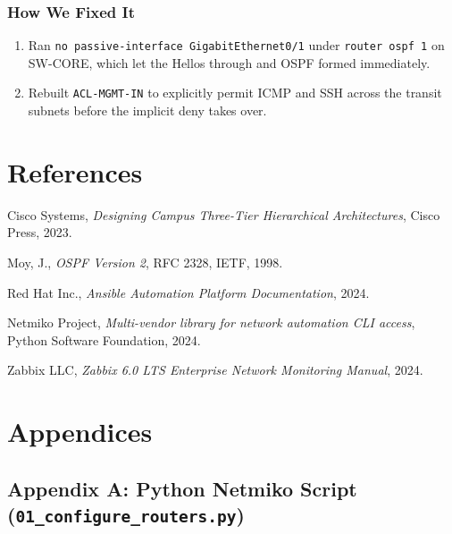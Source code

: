 \documentclass[11pt,a4paper]{article}
\newcommand{\hr}{\vspace{0.2cm}\noindent\hrulefill\vspace{0.2cm}}
\begin{document}
\subsubsection{How We Fixed It}
\begin{enumerate}
    \item Ran \texttt{no passive-interface GigabitEthernet0/1} under \texttt{router ospf 1} on SW-CORE, which let the Hellos through and OSPF formed immediately.
    \item Rebuilt \texttt{ACL-MGMT-IN} to explicitly permit ICMP and SSH across the transit subnets before the implicit deny takes over.
\end{enumerate}

\hr

\section{References}

\begin{enumerate}[label={[\arabic*]}]
    \item Cisco Systems, \textit{Designing Campus Three-Tier Hierarchical Architectures}, Cisco Press, 2023.
    \item Moy, J., \textit{OSPF Version 2}, RFC 2328, IETF, 1998.
    \item Red Hat Inc., \textit{Ansible Automation Platform Documentation}, 2024.
    \item Netmiko Project, \textit{Multi-vendor library for network automation CLI access}, Python Software Foundation, 2024.
    \item Zabbix LLC, \textit{Zabbix 6.0 LTS Enterprise Network Monitoring Manual}, 2024.
\end{enumerate}

\hr

\section{Appendices}

\subsection{Appendix A: Python Netmiko Script (\texttt{01\_configure\_routers.py})}
\end{document}
